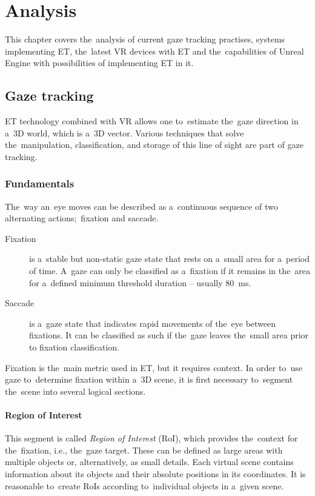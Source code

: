 \chapter{Analysis}
\begin{chapterabstract}
This chapter covers the~analysis of current gaze tracking practises, systems implementing ET, the~latest VR devices with ET and the~capabilities of Unreal Engine with possibilities of implementing ET in it.
\end{chapterabstract}

\section{Gaze tracking}

ET technology combined with VR allows one to~estimate the~gaze direction in a~3D world, which is a~3D vector. Various techniques that solve the~manipulation, classification, and storage of this line of sight are part of gaze tracking.

\subsection{Fundamentals}
The~way an~eye moves can be described as a~continuous sequence of two alternating actions;~fixation and saccade.~\cite{hansen2010, anuradha2017review}

\begin{description}
    \item[Fixation] is a~stable but non-static gaze state that rests on a~small area for a~period of time. A~gaze can only be classified as a~fixation if it remains in the~area for a~defined minimum threshold duration -- usually 80~ms.
    \item[Saccade] is a~gaze state that indicates rapid movements of the~eye between fixations. It can be classified as such if the~gaze leaves the~small area prior to fixation classification.
\end{description}


Fixation is the~main metric used in ET, but it requires context. In order to~use gaze to~determine fixation within a~3D scene, it is first necessary to~segment the~scene into several logical sections.


\subsubsection*{Region of Interest}
This segment is called \emph{Region of Interest} (RoI), which provides the~context for the~fixation, i.e., the~gaze target. These can be defined as large areas with multiple objects or, alternatively, as small details. Each virtual scene contains information about its objects and their absolute positions in its coordinates. It is reasonable to~create RoIs according to~individual objects in a~given scene.~\cite{ugwitz2020thesis}

